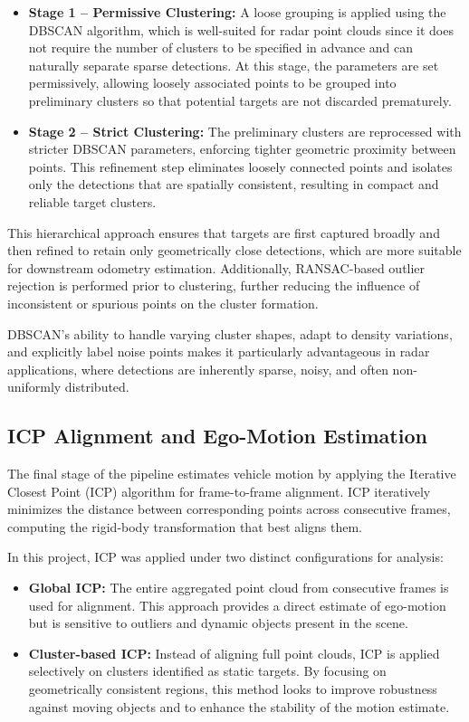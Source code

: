 \begin{itemize}
    \item \textbf{Stage 1 – Permissive Clustering:} A loose grouping is applied using the DBSCAN algorithm, which is well-suited for radar point clouds since it does not require the number of clusters to be specified in advance and can naturally separate sparse detections. 
    At this stage, the parameters are set permissively, allowing loosely associated points to be grouped into preliminary clusters so that potential targets are not discarded prematurely.  
    \item \textbf{Stage 2 – Strict Clustering:} The preliminary clusters are reprocessed with stricter DBSCAN parameters, enforcing tighter geometric proximity between points. 
    This refinement step eliminates loosely connected points and isolates only the detections that are spatially consistent, resulting in compact and reliable target clusters.  
\end{itemize}

This hierarchical approach ensures that targets are first captured broadly and then refined to retain only geometrically close detections, which are more suitable for downstream odometry estimation.  
Additionally, RANSAC-based outlier rejection is performed prior to clustering, further reducing the influence of inconsistent or spurious points on the cluster formation.  

DBSCAN's ability to handle varying cluster shapes, adapt to density variations, and explicitly label noise points makes it particularly advantageous in radar applications, where detections are inherently sparse, noisy, and often non-uniformly distributed.

\subsection*{ICP Alignment and Ego-Motion Estimation}
The final stage of the pipeline estimates vehicle motion by applying the Iterative Closest Point (ICP) algorithm for frame-to-frame alignment. 
ICP iteratively minimizes the distance between corresponding points across consecutive frames, computing the rigid-body transformation that best aligns them.  

In this project, ICP was applied under two distinct configurations for analysis:  

\begin{itemize}
    \item \textbf{Global ICP:} The entire aggregated point cloud from consecutive frames is used for alignment. 
    This approach provides a direct estimate of ego-motion but is sensitive to outliers and dynamic objects present in the scene.  

    \item \textbf{Cluster-based ICP:} Instead of aligning full point clouds, ICP is applied selectively on clusters identified as static targets. 
    By focusing on geometrically consistent regions, this method looks to improve robustness against moving objects and to enhance the stability of the motion estimate.  
\end{itemize}

